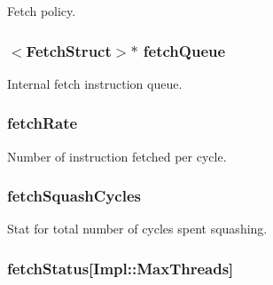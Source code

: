 \label{classDefaultFetch_aad8c2ca9262308cfdb74cd69cda508f6}
Fetch policy. \hypertarget{classDefaultFetch_a9a2f350be647ebfb6567172812db491a}{
\subsubsection[{fetchQueue}]{$<${\bf FetchStruct}$>$$\ast$ {\bf fetchQueue}}}
\label{classDefaultFetch_a9a2f350be647ebfb6567172812db491a}
Internal fetch instruction queue. \hypertarget{classDefaultFetch_a7656c6cac3b62fa389148c650a5d127a}{
\subsubsection[{fetchRate}]{ {\bf fetchRate}}}
\label{classDefaultFetch_a7656c6cac3b62fa389148c650a5d127a}
Number of instruction fetched per cycle. \hypertarget{classDefaultFetch_ae1b92a3469ac6b00fddd788b71f64c9a}{
\subsubsection[{fetchSquashCycles}]{ {\bf fetchSquashCycles}}}
\label{classDefaultFetch_ae1b92a3469ac6b00fddd788b71f64c9a}
Stat for total number of cycles spent squashing. \hypertarget{classDefaultFetch_a852cb41bf6074487410b49ec9ff53c00}{
\subsubsection[{fetchStatus}]{ {\bf fetchStatus}\mbox{[}Impl::MaxThreads\mbox{]}}}
